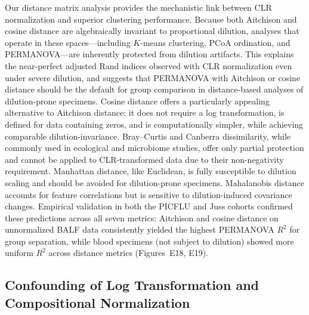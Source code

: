 \documentclass[12pt]{article}
\begin{document}
Our distance matrix analysis provides the mechanistic link between CLR normalization and superior clustering performance. Because both Aitchison and cosine distance are algebraically invariant to proportional dilution, analyses that operate in these spaces---including $K$-means clustering, PCoA ordination, and PERMANOVA---are inherently protected from dilution artifacts. This explains the near-perfect adjusted Rand indices observed with CLR normalization even under severe dilution, and suggests that PERMANOVA with Aitchison or cosine distance should be the default for group comparison in distance-based analyses of dilution-prone specimens. Cosine distance offers a particularly appealing alternative to Aitchison distance: it does not require a log transformation, is defined for data containing zeros, and is computationally simpler, while achieving comparable dilution-invariance. Bray--Curtis and Canberra dissimilarity, while commonly used in ecological and microbiome studies, offer only partial protection and cannot be applied to CLR-transformed data due to their non-negativity requirement. Manhattan distance, like Euclidean, is fully susceptible to dilution scaling and should be avoided for dilution-prone specimens. Mahalanobis distance accounts for feature correlations but is sensitive to dilution-induced covariance changes. Empirical validation in both the PICFLU and Juss cohorts confirmed these predictions across all seven metrics: Aitchison and cosine distance on unnormalized BALF data consistently yielded the highest PERMANOVA $R^2$ for group separation, while blood specimens (not subject to dilution) showed more uniform $R^2$ across distance metrics (Figures~E18, E19).

\subsection{Confounding of Log Transformation and Compositional Normalization}
\end{document}
